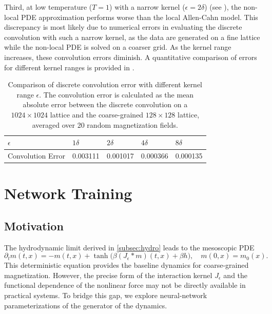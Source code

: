 \documentclass[11pt,a4paper]{article}
\begin{document}
Third, at low temperature ($T=1$) with a narrow kernel ($\epsilon = 2\delta$) 
(see ), 
the non-local PDE approximation performs worse than the local Allen-Cahn model. 
This discrepancy is most likely due to numerical errors in evaluating the discrete convolution with such a narrow kernel, 
as the data are generated on a fine lattice while the non-local PDE is solved on a coarser grid. 
As the kernel range increases, these convolution errors diminish. 
A quantitative comparison of errors for different kernel ranges is provided in .

\begin{table}
    \centering
    \begin{tabular}{lllll}
        \hline
        \hline
        \textbf{$\epsilon$} & $1\delta$ & $2\delta$ & $4\delta$ & $8\delta$ \\
        \hline
        Convolution Error & 0.003111 & 0.001017 & 0.000366 & 0.000135\\
        \hline
        \hline
    \end{tabular}
    \caption{Comparison of discrete convolution error with different kernel range $\epsilon$. The convolution error is calculated as the mean absolute error between the discrete convolution on a $1024\times 1024$ lattice and the coarse-grained $128 \times 128$ lattice, averaged over 20 random magnetization fields.}
    \label{tab:convolution_error}
\end{table}
\section{Network Training}
\label{sec:network}

\subsection{Motivation}
The hydrodynamic limit derived in \cref{subsec:hydro} leads to the mesoscopic PDE
\begin{equation}
\partial_t m(t,x) = -m(t,x) + \tanh\!\big(\beta (J_\epsilon \ast m)(t,x) + \beta h \big),
\quad m(0,x) = m_0(x).
\label{eq:hydro}
\end{equation}
This deterministic equation provides the baseline dynamics for coarse-grained magnetization.
However, the precise form of the interaction kernel $J_\epsilon$ and the functional dependence of
the nonlinear force may not be directly available in practical systems. 
To bridge this gap, we explore neural-network parameterizations of the generator of the dynamics.
\end{document}
